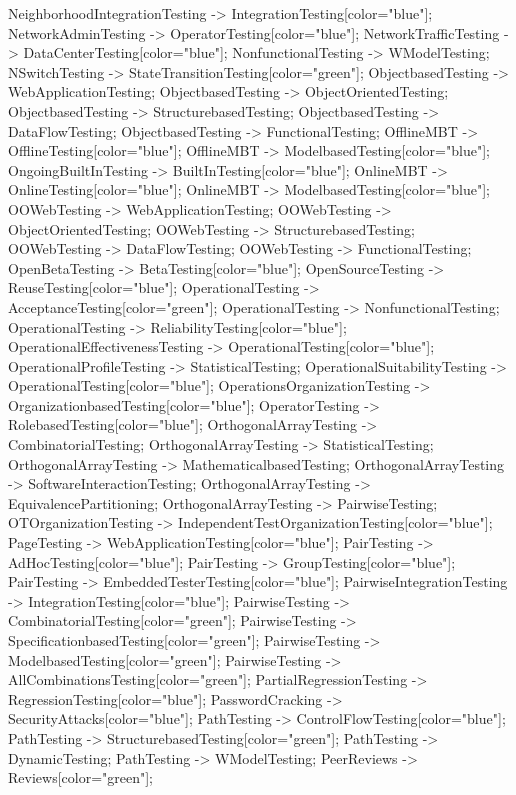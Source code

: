 \documentclass{article}
\begin{document}
{NeighborhoodIntegrationTesting -> IntegrationTesting[color="blue"];
NetworkAdminTesting -> OperatorTesting[color="blue"];
NetworkTrafficTesting -> DataCenterTesting[color="blue"];
NonfunctionalTesting -> WModelTesting;
NSwitchTesting -> StateTransitionTesting[color="green"];
ObjectbasedTesting -> WebApplicationTesting;
ObjectbasedTesting -> ObjectOrientedTesting;
ObjectbasedTesting -> StructurebasedTesting;
ObjectbasedTesting -> DataFlowTesting;
ObjectbasedTesting -> FunctionalTesting;
OfflineMBT -> OfflineTesting[color="blue"];
OfflineMBT -> ModelbasedTesting[color="blue"];
OngoingBuiltInTesting -> BuiltInTesting[color="blue"];
OnlineMBT -> OnlineTesting[color="blue"];
OnlineMBT -> ModelbasedTesting[color="blue"];
OOWebTesting -> WebApplicationTesting;
OOWebTesting -> ObjectOrientedTesting;
OOWebTesting -> StructurebasedTesting;
OOWebTesting -> DataFlowTesting;
OOWebTesting -> FunctionalTesting;
OpenBetaTesting -> BetaTesting[color="blue"];
OpenSourceTesting -> ReuseTesting[color="blue"];
OperationalTesting -> AcceptanceTesting[color="green"];
OperationalTesting -> NonfunctionalTesting;
OperationalTesting -> ReliabilityTesting[color="blue"];
OperationalEffectivenessTesting -> OperationalTesting[color="blue"];
OperationalProfileTesting -> StatisticalTesting;
OperationalSuitabilityTesting -> OperationalTesting[color="blue"];
OperationsOrganizationTesting -> OrganizationbasedTesting[color="blue"];
OperatorTesting -> RolebasedTesting[color="blue"];
OrthogonalArrayTesting -> CombinatorialTesting;
OrthogonalArrayTesting -> StatisticalTesting;
OrthogonalArrayTesting -> MathematicalbasedTesting;
OrthogonalArrayTesting -> SoftwareInteractionTesting;
OrthogonalArrayTesting -> EquivalencePartitioning;
OrthogonalArrayTesting -> PairwiseTesting;
OTOrganizationTesting -> IndependentTestOrganizationTesting[color="blue"];
PageTesting -> WebApplicationTesting[color="blue"];
PairTesting -> AdHocTesting[color="blue"];
PairTesting -> GroupTesting[color="blue"];
PairTesting -> EmbeddedTesterTesting[color="blue"];
PairwiseIntegrationTesting -> IntegrationTesting[color="blue"];
PairwiseTesting -> CombinatorialTesting[color="green"];
PairwiseTesting -> SpecificationbasedTesting[color="green"];
PairwiseTesting -> ModelbasedTesting[color="green"];
PairwiseTesting -> AllCombinationsTesting[color="green"];
PartialRegressionTesting -> RegressionTesting[color="blue"];
PasswordCracking -> SecurityAttacks[color="blue"];
PathTesting -> ControlFlowTesting[color="blue"];
PathTesting -> StructurebasedTesting[color="green"];
PathTesting -> DynamicTesting;
PathTesting -> WModelTesting;
PeerReviews -> Reviews[color="green"];
}
\end{document}
